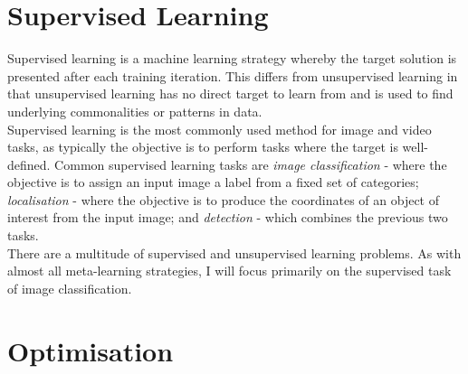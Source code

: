 \documentclass{report}
\begin{document}
	\section{Supervised Learning}
	Supervised learning is a machine learning strategy whereby the target solution is presented after each training iteration. This differs from unsupervised learning in that unsupervised learning has no direct target to learn from and is used to find underlying commonalities or patterns in data. \\
	Supervised learning is the most commonly used method for image and video tasks, as typically the objective is to perform tasks where the target is well-defined. Common supervised learning tasks are \textit{image classification} - where the objective is to assign an input image a label from a fixed set of categories; \textit{localisation} - where the objective is to produce the coordinates of an object of interest from the input image; and \textit{detection} - which combines the previous two tasks. \\
	There are a multitude of supervised and unsupervised learning problems. As with almost all meta-learning strategies, I will focus primarily on the supervised task of image classification.
	\section{Optimisation}
\end{document}

